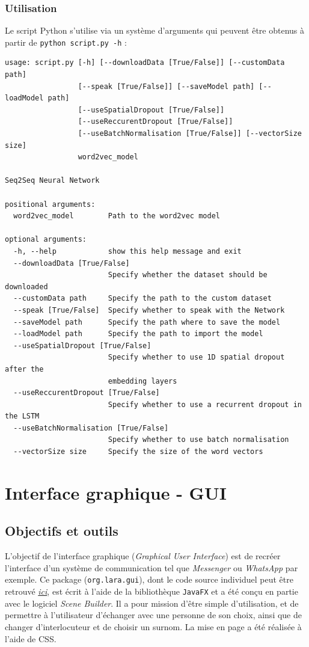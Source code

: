 \documentclass[10pt,a4paper]{article}
\begin{document}
\subsubsection{Utilisation}
Le script Python s'utilise via un système d'arguments qui peuvent être obtenus à partir de \texttt{python script.py -h} :
\begin{verbatim}
usage: script.py [-h] [--downloadData [True/False]] [--customData path]
                 [--speak [True/False]] [--saveModel path] [--loadModel path]
                 [--useSpatialDropout [True/False]]
                 [--useReccurentDropout [True/False]]
                 [--useBatchNormalisation [True/False]] [--vectorSize size]
                 word2vec_model

Seq2Seq Neural Network

positional arguments:
  word2vec_model        Path to the word2vec model

optional arguments:
  -h, --help            show this help message and exit
  --downloadData [True/False]
                        Specify whether the dataset should be downloaded
  --customData path     Specify the path to the custom dataset
  --speak [True/False]  Specify whether to speak with the Network
  --saveModel path      Specify the path where to save the model
  --loadModel path      Specify the path to import the model
  --useSpatialDropout [True/False]
                        Specify whether to use 1D spatial dropout after the
                        embedding layers
  --useReccurentDropout [True/False]
                        Specify whether to use a recurrent dropout in the LSTM
  --useBatchNormalisation [True/False]
                        Specify whether to use batch normalisation
  --vectorSize size     Specify the size of the word vectors
\end{verbatim}

\section{Interface graphique - GUI}
\subsection{Objectifs et outils}

L'objectif de l'interface graphique (\textit{Graphical User Interface}) est de recréer l'interface d'un système de communication tel que \textit{Messenger} ou \textit{WhatsApp} par exemple. Ce package (\texttt{org.lara.gui}), dont le code source individuel peut être retrouvé \href{https://github.com/LaraProject/GUI}{\textit{ici}}, est écrit à l'aide de la bibliothèque \texttt{JavaFX} et a été conçu en partie avec le logiciel \textit{Scene Builder}. Il a pour mission d'être simple d'utilisation, et de permettre à l'utilisateur d'échanger avec une personne de son choix, ainsi que de changer d'interlocuteur et de choisir un surnom. La mise en page a été réalisée à l'aide de CSS.
\end{document}
